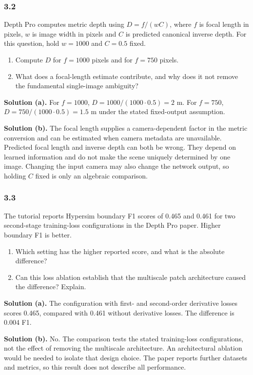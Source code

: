 \documentclass[11pt,a4paper]{article}
\begin{document}
\begin{minipage}{\linewidth}
\subsubsection*{3.2}
Depth Pro computes metric depth using $D=f/(wC)$, where $f$ is focal length in pixels, $w$ is image width in pixels and $C$ is predicted canonical inverse depth.
For this question, hold $w=1000$ and $C=0.5$ fixed.
\begin{enumerate}[label=(\alph*),nosep]
\item Compute $D$ for $f=1000$ pixels and for $f=750$ pixels.
\item What does a focal-length estimate contribute, and why does it not remove the fundamental single-image ambiguity?
\end{enumerate}
\ifsolutions
\noindent\textbf{Solution (a).}
For $f=1000$, $D=1000/(1000\cdot0.5)=2$ m.
For $f=750$, $D=750/(1000\cdot0.5)=1.5$ m under the stated fixed-output assumption.

\noindent\textbf{Solution (b).}
The focal length supplies a camera-dependent factor in the metric conversion and can be estimated when camera metadata are unavailable.
Predicted focal length and inverse depth can both be wrong.
They depend on learned information and do not make the scene uniquely determined by one image.
Changing the input camera may also change the network output, so holding $C$ fixed is only an algebraic comparison.
\fi
\end{minipage}
\par\medskip
\par\noindent
\begin{minipage}{\linewidth}
\subsubsection*{3.3}
The tutorial reports Hypersim boundary F1 scores of 0.465 and 0.461 for two second-stage training-loss configurations in the Depth Pro paper.
Higher boundary F1 is better.
\begin{enumerate}[label=(\alph*),nosep]
\item Which setting has the higher reported score, and what is the absolute difference?
\item Can this loss ablation establish that the multiscale patch architecture caused the difference?
Explain.
\end{enumerate}
\ifsolutions
\noindent\textbf{Solution (a).}
The configuration with first- and second-order derivative losses scores 0.465, compared with 0.461 without derivative losses.
The difference is 0.004 F1.

\noindent\textbf{Solution (b).}
No.
The comparison tests the stated training-loss configurations, not the effect of removing the multiscale architecture.
An architectural ablation would be needed to isolate that design choice.
The paper reports further datasets and metrics, so this result does not describe all performance.
\fi
\end{minipage}
\par\medskip
{}
\end{document}
